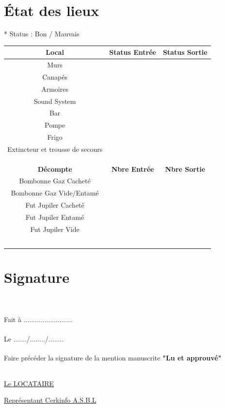 \documentclass{article}
\begin{document}
\section*{État des lieux}
\begin{center}
* Status : Bon / Mauvais
\end{center}
\begin{center}
\begin{tabular}{ |c|c|c| } 
 \hline
 \textbf{Local} & \textbf{Status Entrée} & \textbf{Status Sortie} \\
 \hline
 Murs &  &  \\
 \hline
 Canapés &  &  \\
 \hline
 Armoires &  &  \\
 \hline
 Sound System &  &  \\
 \hline
 Bar &  &  \\
 \hline
 Pompe &  &  \\
 \hline
 Frigo &  &  \\
 \hline
 Extincteur et trousse de secours &  &  \\
 \hline
  &  &  \\
 \hline
  &  &  \\
 \hline
  &  &  \\
 \hline
 \textbf{Décompte} & \textbf{Nbre Entrée} & \textbf{Nbre Sortie} \\
 \hline
 Bombonne Gaz Cacheté &  &  \\
 \hline
 Bombonne Gaz Vide/Entamé &  &  \\
 \hline
 Fut Jupiler Cacheté &  &  \\
 \hline
 Fut Jupiler Entamé &  &  \\
 \hline
 Fut Jupiler Vide &  &  \\
 \hline
  &  &  \\
 \hline
  &  &  \\
 \hline
  &  &  \\
 \hline
  &  &  \\
 \hline
  &  &  \\
 \hline
\end{tabular}
\end{center}

\section*{Signature}\\\\
Fait à .......................... \\\\
Le ......./......../........ \\\\
Faire précéder la signature de la mention manuscrite \textbf{"Lu et approuvé"}\\\\

\begin{minipage}{0.5\textwidth}
\underline{Le LOCATAIRE}
\end{minipage}
\begin{minipage}{0.5\textwidth}\raggedleft
\underline{Représentant Cerkinfo A.S.B.L}
\end{minipage}
\end{document}
